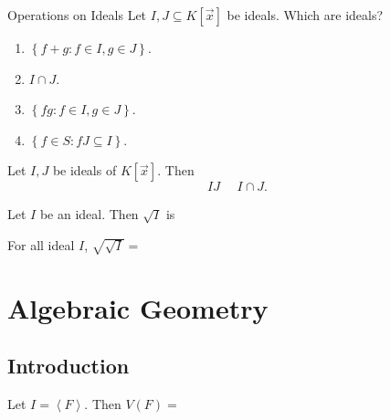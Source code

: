\documentclass[11pt]{article}
\begin{document}
    \rruleline
    
    \begin{prop}{Operations on Ideals}
        Let $I,J\subseteq K\left[ \vec{x} \right]$ be ideals. Which are ideals?
        \begin{enumerate}
            \item $\left\lbrace f+g:f\in I, g\in J \right\rbrace$.
            \item $I\cap J$.
            \item $\left\lbrace fg: f\in I, g\in J \right\rbrace$.
            \item $\left\lbrace f\in S: fJ\subseteq I \right\rbrace$.
        \end{enumerate}
    \end{prop}

    \rruleline

    \begin{prop}{}
        Let $I,J$ be ideals of $K\left[ \vec{x} \right]$. Then
        \begin{equation*}
            IJ \phantom{\subseteq} I\cap J.
        \end{equation*}
    \end{prop}

    \rruleline

    \begin{prop}{}
        Let $I$ be an ideal. Then $\sqrt{I}$ is
    \end{prop}

    \rruleline

    \begin{prop}{}
        For all ideal $I$, $\sqrt{\sqrt{I}} =$ 
    \end{prop}

    \rruleline

    \section{Algebraic Geometry}

    \subsection{Introduction}

    \begin{lemma}{}
        Let $I = \left< F \right>$. Then $V\left( F \right) =$
    \end{lemma}

    \rruleline
\end{document}
